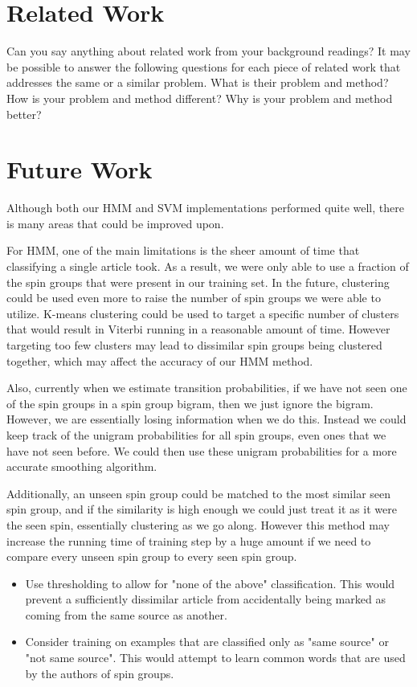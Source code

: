 \documentclass[11pt,letterpaper,oneside, titlepage]{scrartcl}
\begin{document}
\section{Related Work}

Can you say anything about related work from your background readings? It may be possible to answer the following questions for each piece of related work that addresses the same or a similar problem. What is their problem and method? How is your problem and method different? Why is your problem and method better? 

\section{Future Work}
Although both our HMM and SVM implementations performed quite well, there is many areas that could be improved upon.

For HMM, one of the main limitations is the sheer amount of time that classifying a single article took. As a result, we were only able to use a fraction of the spin groups that were present in our training set. In the future, clustering could be used even more to raise the number of spin groups we were able to utilize. K-means clustering could be used to target a specific number of clusters that would result in Viterbi running in a reasonable amount of time. However targeting too few clusters may lead to dissimilar spin groups being clustered together, which may affect the accuracy of our HMM method.

Also, currently when we estimate transition probabilities, if we have not seen one of the spin groups in a spin group bigram, then we just ignore the bigram. However, we are essentially losing information when we do this. Instead we could keep track of the unigram probabilities for all spin groups, even ones that we have not seen before. We could then use these unigram probabilities for a more accurate smoothing algorithm. 

Additionally, an unseen spin group could be matched to the most similar seen spin group, and if the similarity is high enough we could just treat it as it were the seen spin, essentially clustering as we go along. However this method may increase the running time of training step by a huge amount if we need to compare every unseen spin group to every seen spin group.
 
\begin{itemize}

\item Use thresholding to allow for "none of the above" classification.  This would prevent a sufficiently dissimilar article from accidentally being marked as coming from the same source as another.

\item Consider training on examples that are classified only as "same source" or "not same source".  This would attempt to learn common words that are used by the authors of spin groups.

\end{itemize}
\end{document}
